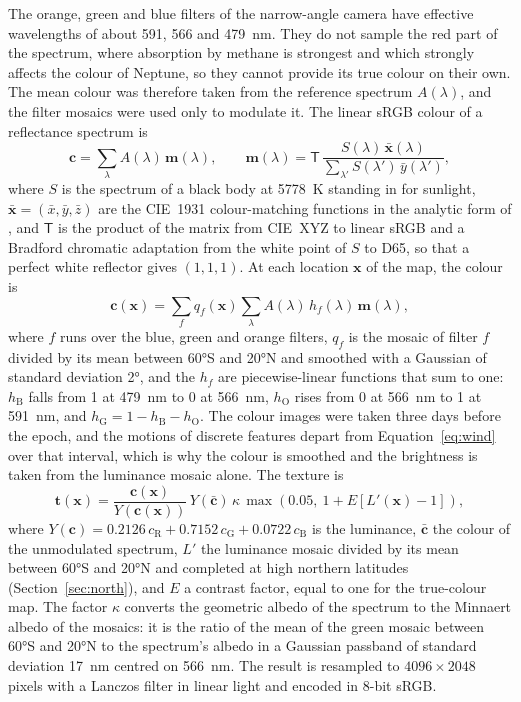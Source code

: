 \documentclass[11pt,a4paper]{article}
\newcommand{\vect}[1]{\mathbf{#1}}
\begin{document}
The orange, green and blue filters of the narrow-angle camera have effective wavelengths of about
591, 566 and 479~nm. They do not sample the red part of the spectrum, where absorption by methane
is strongest and which strongly affects the colour of Neptune, so they cannot provide its true
colour on their own. The mean colour was therefore taken from the reference spectrum $A(\lambda)$,
and the filter mosaics were used only to modulate it. The linear sRGB colour of a reflectance
spectrum is
\begin{equation}
\vect{c} = \sum_{\lambda} A(\lambda)\,\vect{m}(\lambda), \qquad
\vect{m}(\lambda) = \mathsf{T}\,\frac{S(\lambda)\,\bar{\vect{x}}(\lambda)}
{\sum_{\lambda'} S(\lambda')\,\bar{y}(\lambda')},
\label{eq:colour}
\end{equation}
where $S$ is the spectrum of a black body at 5778~K standing in for sunlight,
$\bar{\vect{x}} = (\bar{x}, \bar{y}, \bar{z})$ are the CIE~1931 colour-matching functions in the
analytic form of \citet{wyman2013}, and $\mathsf{T}$ is the product of the matrix from CIE~XYZ to
linear sRGB \citep{iec1999} and a Bradford chromatic adaptation \citep{lam1985} from the white
point of $S$ to D65, so that a perfect white reflector gives $(1, 1, 1)$. At each location
$\vect{x}$ of the map, the colour is
\begin{equation}
\vect{c}(\vect{x}) = \sum_{f} q_{f}(\vect{x}) \sum_{\lambda} A(\lambda)\,h_{f}(\lambda)\,
\vect{m}(\lambda),
\label{eq:modulated}
\end{equation}
where $f$ runs over the blue, green and orange filters, $q_{f}$ is the mosaic of filter $f$
divided by its mean between \ang{60}S and \ang{20}N and smoothed with a Gaussian of standard
deviation \ang{2}, and the $h_{f}$ are piecewise-linear functions that sum to one: $h_{\mathrm{B}}$
falls from 1 at 479~nm to 0 at 566~nm, $h_{\mathrm{O}}$ rises from 0 at 566~nm to 1 at 591~nm, and
$h_{\mathrm{G}} = 1 - h_{\mathrm{B}} - h_{\mathrm{O}}$. The colour images were taken three days
before the epoch, and the motions of discrete features depart from Equation~\eqref{eq:wind} over
that interval, which is why the colour is smoothed and the brightness is taken from the luminance
mosaic alone. The texture is
\begin{equation}
\vect{t}(\vect{x}) = \frac{\vect{c}(\vect{x})}{Y\!\left(\vect{c}(\vect{x})\right)}\,
Y(\bar{\vect{c}})\,\kappa\,\max\!\left(0.05,\ 1 + E\left[L'(\vect{x}) - 1\right]\right),
\label{eq:texture}
\end{equation}
where $Y(\vect{c}) = 0.2126\,c_{\mathrm{R}} + 0.7152\,c_{\mathrm{G}} + 0.0722\,c_{\mathrm{B}}$ is the
luminance, $\bar{\vect{c}}$ the colour of the unmodulated spectrum, $L'$ the luminance mosaic
divided by its mean between \ang{60}S and \ang{20}N and completed at high northern latitudes
(Section~\ref{sec:north}), and $E$ a contrast factor, equal to one for the true-colour map. The factor $\kappa$ converts the geometric albedo of the spectrum to the Minnaert
albedo of the mosaics: it is the ratio of the mean of the green mosaic between \ang{60}S and
\ang{20}N to the spectrum's albedo in a Gaussian passband of standard deviation 17~nm centred on
566~nm. The result is resampled to $4096\times2048$ pixels with a Lanczos filter in linear light
and encoded in 8-bit sRGB.
\end{document}
